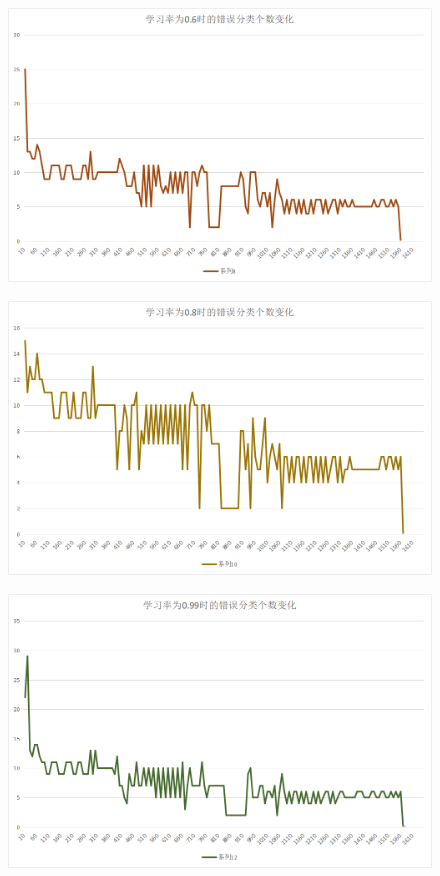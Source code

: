 \documentclass[10pt,a4paper]{ctexart}
\begin{document}
    \begin{figure}[htbp]
  \centering
\includegraphics[width=1\textwidth]{0.6.png}
  \end{figure}
    \begin{figure}[htbp]
  \centering
\includegraphics[width=1\textwidth]{0.8.png}
  \end{figure}
    \begin{figure}[htbp]
  \centering
\includegraphics[width=1\textwidth]{0.99.png}
\end{figure}
\newpage
\end{document}
